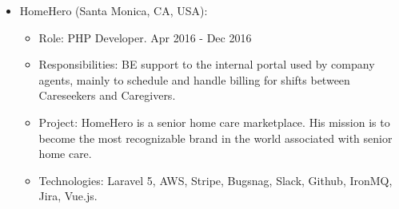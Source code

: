 \documentclass[11pt,a4paper,sans]{moderncv}        %
\begin{document}
{\begin{itemize}
\begin{itemize}
          \item Role: Ruby Developer. Feb 2017 - Apr 2017
          \item Responsibilities: Maintenance to web application, SEO.
          \item Project: Dering Hall is a curated shopping resource for discerning consumers and trade providing insider access to thousands of luxury design products and services.
          \item Technologies: Rails 5, MySQL, Elasticsearch, jQuery, Heroku.
        \end{itemize}
      \item HomeHero (Santa Monica, CA, USA):
        \begin{itemize}
          \item Role: PHP Developer. Apr 2016 - Dec 2016
          \item Responsibilities: BE support to the internal portal used by company agents, mainly to schedule and handle billing for shifts between Careseekers and Caregivers.
          \item Project: HomeHero is a senior home care marketplace. His mission is to become the most recognizable brand in the world associated with senior home care.
          \item Technologies: Laravel 5, AWS, Stripe, Bugsnag, Slack, Github, IronMQ, Jira, Vue.js.
        \end{itemize}
    \end{itemize}
  }
\end{document}
